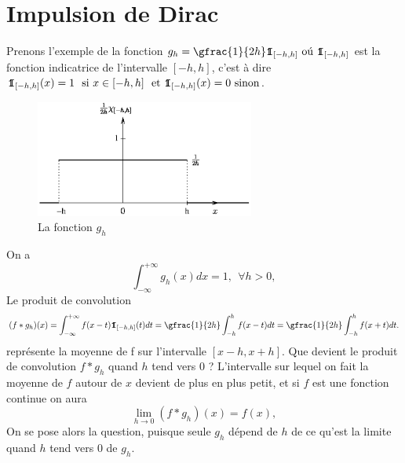 \section{Impulsion de Dirac}
Prenons l'exemple de la fonction $g_h=\gfrac{1}{2h}\text{\tt 1\hspace{-0.14cm}I}_{[-h,h]}\ \text{o\'u}\ \text{\tt 1\hspace{-0.14cm}I}_{[-h,h]}$ est la fonction indicatrice de l'intervalle $[-h,h]$, c'est à dire $\text{\tt 1\hspace{-0.14cm}I}_{[-h,h]}(x)=1~\text{ si}~ x\in[-h,h]~\text{ et}~ \text{\tt 1\hspace{-0.14cm}I}_{[-h,h]}(x)=0~\text{sinon}$.
\begin{figure}[htbp]
  \begin{center}
    \includegraphics[width=7.2cm]{polyic2_gh.eps}
  \end{center}
\caption{La fonction $g_h$}
\end{figure}
On a 
$$ \int_{-\infty}^{+\infty}g_h(x)dx = 1, \ \ \forall h > 0, $$
Le produit de convolution 
$$ (f*g_h)(x) = \int_{-\infty}^{+\infty}f(x-t)\text{\tt 1\hspace{-0.14cm}I}_{[-h,h]}(t)dt = \gfrac{1}{2h}\int_{-h}^hf(x-t)dt = \gfrac{1}{2h}\int_{-h}^hf(x+t)dt. $$
représente la moyenne de f sur l'intervalle $[x-h, x+h]$. 
Que devient le produit de convolution $f*g_h$ quand $h$ tend vers $0$ ? L'intervalle sur lequel on fait la moyenne de $f$ autour de $x$ devient de plus en plus petit, et si $f$ est une fonction continue on aura
$$ \lim_{h \rightarrow 0} (f*g_h)(x) = f(x), $$
On se pose alors la question, puisque seule $g_h$ dépend de $h$ de ce qu'est la limite 
quand $h$ tend vers 0 de $g_h$.

